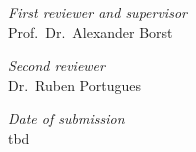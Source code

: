 \hfill

\vfill

\textit{First reviewer and supervisor} \\
Prof.\ Dr.\ Alexander Borst

\bigskip

\textit{Second reviewer} \\
Dr.\ Ruben Portugues

\bigskip

\textit{Date of submission} \\
tbd


